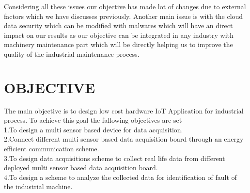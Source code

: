 Considering all these issues our objective has made lot of changes due to external factors which we have discusses previously. Another main issue is with the cloud data security which can be modified with malwares which will have an direct impact on our results as our objective can be integrated in any industry with machinery maintenance part which will be directly helping us to improve the quality of the industrial maintenance process.
\section{OBJECTIVE}
The main objective is to design low cost hardware IoT Application for industrial process.
To achieve this goal the fallowing objectives are set \\
1.To design a multi sensor based device for data acquisition.\\
2.Connect different multi sensor based data acquisition board through an energy efficient communication scheme.\\
3.To design data acquisitions scheme to collect real life data from different deployed multi sensor based data acquisition board.\\
4.To design a scheme to analyze the collected data for identification of fault of the industrial machine.\\
